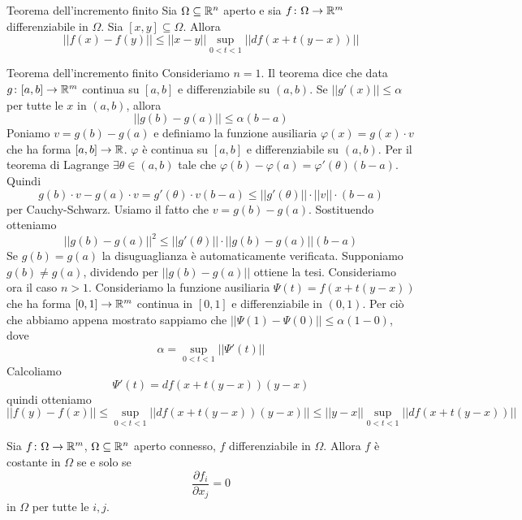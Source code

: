 \documentclass[a4paper]{article}
\begin{document}
\begin{radioactive}
\begin{snippettheorem}{Teorema dell'incremento finito}
    Sia \(\Omega \subseteq \mathbb{R}^n\) aperto e sia \(f\colon \Omega \to \mathbb{R}^m\)
    differenziabile in \(\Omega\). Sia \([x,y] \subseteq \Omega\).
    Allora 
    \[
        ||f(x)-f(y)|| \leq ||x-y|| \sup_{0 < t < 1} || df(x + t(y-x)) ||
    \]
\end{snippettheorem}
\end{radioactive}

\begin{radioactive}
\begin{snippetproof}{Teorema dell'incremento finito}
    Consideriamo \(n=1\). Il teorema
    dice che data \(g\colon [a,b] \to \mathbb{R}^m\) continua su \([a,b]\)
    e differenziabile su \((a,b)\). Se \(||g'(x)|| \leq \alpha\) per tutte le \(x\)
    in \((a,b)\), allora
    \[
        ||g(b) - g(a)|| \leq \alpha(b-a)
    \]
    Poniamo \(v = g(b) - g(a)\) e definiamo la funzione ausiliaria \(\varphi(x) = g(x) \cdot v\)
    che ha forma \([a,b] \to \mathbb{R}\). \(\varphi\) è continua su \([a,b]\) e differenziabile su
    \((a,b)\). Per il teorema di Lagrange \(\exists \theta \in (a,b)\) tale che
    \(\varphi(b) - \varphi(a) = \varphi'(\theta)(b-a)\).
    Quindi \[
        g(b) \cdot v - g(a) \cdot v = g'(\theta) \cdot v(b-a)
        \leq ||g'(\theta)|| \cdot || v || \cdot (b-a)
    \]
    per Cauchy-Schwarz.
    Usiamo il fatto che \(v = g(b) - g(a)\).
    Sostituendo otteniamo
    \[
        ||g(b) - g(a)||^2 \leq ||g'(\theta)|| \cdot || g(b) - g(a) || (b-a)
    \]
    Se \(g(b) = g(a)\) la disuguaglianza è automaticamente verificata. Supponiamo \(g(b) \neq g(a)\), dividendo per
    \(||g(b) - g(a)||\) ottiene la tesi.
    Consideriamo ora il caso \(n>1\).
    Consideriamo la funzione ausiliaria \(\Psi(t) = f(x + t(y-x))\)
    che ha forma \([0,1] \to \mathbb{R}^m\) continua in \([0,1]\) e differenziabile in \((0,1)\).
    Per ciò che abbiamo appena mostrato sappiamo che
    \(||\Psi(1) - \Psi(0)|| \leq \alpha(1-0)\), dove
    \[
        \alpha = \sup_{0<t<1} ||\Psi'(t)||
    \]
    Calcoliamo
    \[
        \Psi'(t) = df(x + t(y-x))(y-x)
    \]
    quindi otteniamo
    \[
        ||f(y)-f(x)|| \leq \sup_{0<t<1} ||df(x + t(y-x))(y-x)|| \leq
        ||y-x|| \sup_{0<t<1} ||df(x + t(y-x))||
    \]
\end{snippetproof}
\end{radioactive}

\begin{radioactive}
\begin{snippetcorollary}{}
    Sia \(f\colon \Omega \to \mathbb{R}^m\), \(\Omega \subseteq \mathbb{R}^n\) aperto connesso,
    \(f\) differenziabile in \(\Omega\).
    Allora \(f\) è costante in \(\Omega\) se e solo se
    \[
        \frac{\partial f_i}{\partial x_j} =0
    \]
    in \(\Omega\) per tutte le \(i,j\).
\end{snippetcorollary}
\end{radioactive}
\end{document}
